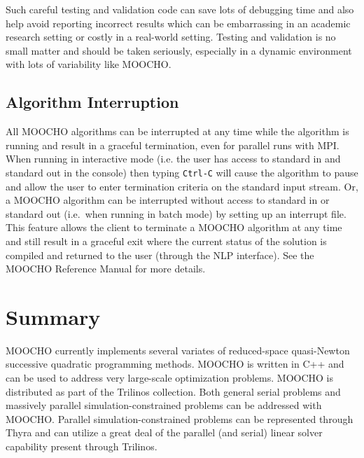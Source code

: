 \documentclass[pdf,12pt,report]{SANDreport}
\begin{document}
Such careful testing and validation code can save lots of debugging time and
also help avoid reporting incorrect results which can be embarrassing in an
academic research setting or costly in a real-world setting.  Testing and
validation is no small matter and should be taken seriously, especially in a
dynamic environment with lots of variability like MOOCHO.

%
\subsection{Algorithm Interruption}
\label{moocho:sec:interruption}
%

All MOOCHO algorithms can be interrupted at any time while the algorithm is
running and result in a graceful termination, even for parallel runs with MPI.
When running in interactive mode (i.e. the user has access to standard in and
standard out in the console) then typing {}\texttt{Ctrl-C} will cause the
algorithm to pause and allow the user to enter termination criteria on the
standard input stream.  Or, a MOOCHO algorithm can be interrupted without
access to standard in or standard out (i.e.\ when running in batch mode) by
setting up an interrupt file.  This feature allows the client to terminate a
MOOCHO algorithm at any time and still result in a graceful exit where the
current status of the solution is compiled and returned to the user (through
the NLP interface).  See the MOOCHO Reference Manual
{}\cite{ref:moochorefguide} for more details.

%
\section{Summary}
%

MOOCHO currently implements several variates of reduced-space quasi-Newton
successive quadratic programming methods.  MOOCHO is written in C++ and can be
used to address very large-scale optimization problems.  MOOCHO is distributed
as part of the Trilinos {}\cite{ref:trilinos} collection.  Both general serial
problems and massively parallel simulation-constrained problems can be
addressed with MOOCHO.  Parallel simulation-constrained problems can be
represented through Thyra and can utilize a great deal of the parallel (and
serial) linear solver capability present through Trilinos.


%
\clearpage
\providecommand*{\phantomsection}{}
\phantomsection




%
\appendix



\begin{SANDdistribution}[NM]
\end{SANDdistribution}
\end{document}
